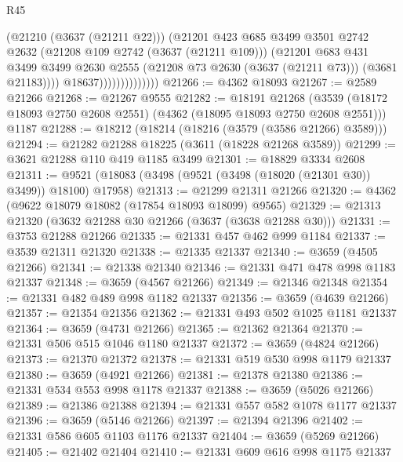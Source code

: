 \begin{lexlean}{R45}
\begin{coremodule}
                                  (@21210 (@3637 (@21211 @22)))
                                  (@21201
                                    @423
                                    @685
                                    @3499
                                    @3501
                                    @2742
                                    @2632
                                    (@21208 @109 @2742 (@3637 (@21211 @109)))
                                    (@21201
                                      @683
                                      @431
                                      @3499
                                      @3499
                                      @2630
                                      @2555
                                      (@21208 @73 @2630 (@3637 (@21211 @73)))
                                      (@3681 @21183))))
                                @18637))))))))))))))
@21266 := @4362 @18093
@21267 := @2589 @21266
@21268 := @21267 @9555
@21282 := @18191
    @21268
    (@3539 (@18172 @18093 @2750 @2608 @2551) (@4362 (@18095 @18093 @2750 @2608 @2551)))
    @1187
@21288 := @18212 (@18214 (@18216 (@3579 (@3586 @21266) @3589)))
@21294 := @21282 @21288 @18225 (@3611 (@18228 @21268 @3589))
@21299 := @3621 @21288 @110 @419 @1185 @3499
@21301 := @18829 @3334 @2608
@21311 := @9521 (@18083 (@3498 (@9521 (@3498 (@18020 (@21301 @30)) @3499)) @18100) @17958)
@21313 := @21299 @21311 @21266
@21320 := @4362 (@9622 @18079 @18082 (@17854 @18093 @18099) @9565)
@21329 := @21313 @21320 (@3632 @21288 @30 @21266 (@3637 (@3638 @21288 @30)))
@21331 := @3753 @21288 @21266
@21335 := @21331 @457 @462 @999 @1184
@21337 := @3539 @21311 @21320
@21338 := @21335 @21337
@21340 := @3659 (@4505 @21266)
@21341 := @21338 @21340
@21346 := @21331 @471 @478 @998 @1183 @21337
@21348 := @3659 (@4567 @21266)
@21349 := @21346 @21348
@21354 := @21331 @482 @489 @998 @1182 @21337
@21356 := @3659 (@4639 @21266)
@21357 := @21354 @21356
@21362 := @21331 @493 @502 @1025 @1181 @21337
@21364 := @3659 (@4731 @21266)
@21365 := @21362 @21364
@21370 := @21331 @506 @515 @1046 @1180 @21337
@21372 := @3659 (@4824 @21266)
@21373 := @21370 @21372
@21378 := @21331 @519 @530 @998 @1179 @21337
@21380 := @3659 (@4921 @21266)
@21381 := @21378 @21380
@21386 := @21331 @534 @553 @998 @1178 @21337
@21388 := @3659 (@5026 @21266)
@21389 := @21386 @21388
@21394 := @21331 @557 @582 @1078 @1177 @21337
@21396 := @3659 (@5146 @21266)
@21397 := @21394 @21396
@21402 := @21331 @586 @605 @1103 @1176 @21337
@21404 := @3659 (@5269 @21266)
@21405 := @21402 @21404
@21410 := @21331 @609 @616 @998 @1175 @21337

\end{coremodule}
\end{lexlean}
